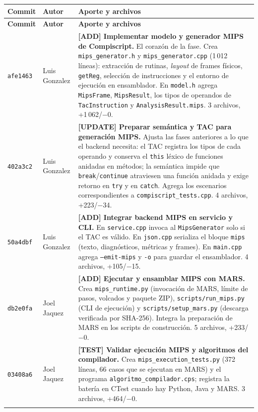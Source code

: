\documentclass[11pt,a4paper]{article}
\begin{document}
\begin{longtable}{@{}p{1.6cm}L{2.7cm}L{9.1cm}@{}}
\toprule
\textbf{Commit} & \textbf{Autor} & \textbf{Aporte y archivos} \\
\midrule
\endfirsthead
\toprule
\textbf{Commit} & \textbf{Autor} & \textbf{Aporte y archivos} \\
\midrule
\endhead

\texttt{afe1463} & Luis Gonzalez &
\textbf{[ADD] Implementar modelo y generador MIPS de Compiscript.} El corazón
de la fase. Crea \texttt{mips\_generator.h} y \texttt{mips\_generator.cpp}
(1\,012 líneas): extracción de rutinas, \emph{layout} de frames físicos,
\texttt{getReg}, selección de instrucciones y el entorno de ejecución en
ensamblador. En \texttt{model.h} agrega \texttt{MipsFrame}, \texttt{MipsResult},
los tipos de operandos de \texttt{TacInstruction} y \texttt{AnalysisResult.mips}.
3 archivos, +1\,062/$-$0. \\
\addlinespace

\texttt{402a3c2} & Luis Gonzalez &
\textbf{[UPDATE] Preparar semántica y TAC para generación MIPS.} Ajusta las
fases anteriores a lo que el backend necesita: el TAC registra los tipos de
cada operando y conserva el \texttt{this} léxico de funciones anidadas en
métodos; la semántica impide que \texttt{break}/\texttt{continue} atraviesen una
función anidada y exige retorno en \texttt{try} y en \texttt{catch}. Agrega los
escenarios correspondientes a \texttt{compiscript\_tests.cpp}. 4 archivos,
+223/$-$34. \\
\addlinespace

\texttt{50a4dbf} & Luis Gonzalez &
\textbf{[ADD] Integrar backend MIPS en servicio y CLI.} En \texttt{service.cpp}
invoca al \texttt{MipsGenerator} solo si el TAC es válido. En \texttt{json.cpp}
serializa el bloque \texttt{mips} (texto, diagnósticos, métricas y frames). En
\texttt{main.cpp} agrega \texttt{--emit-mips} y \texttt{-o} para guardar el
ensamblador. 4 archivos, +105/$-$15. \\
\addlinespace

\texttt{db2e0fa} & Joel Jaquez &
\textbf{[ADD] Ejecutar y ensamblar MIPS con MARS.} Crea
\texttt{mips\_runtime.py} (invocación de MARS, límite de pasos, volcados y
paquete ZIP), \texttt{scripts/run\_mips.py} (CLI de ejecución) y
\texttt{scripts/setup\_mars.py} (descarga verificada por SHA-256). Integra la
preparación de MARS en los scripts de construcción. 5 archivos, +233/$-$0. \\
\addlinespace

\texttt{03408a6} & Joel Jaquez &
\textbf{[TEST] Validar ejecución MIPS y algoritmos del compilador.} Crea
\texttt{mips\_execution\_tests.py} (372 líneas, 66 casos que se ejecutan en
MARS) y el programa \texttt{algoritmo\_compilador.cps}; registra la batería en
CTest cuando hay Python, Java y MARS. 3 archivos, +464/$-$0. \\
\addlinespace


\end{longtable}
\end{document}
